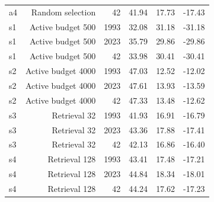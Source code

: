 \documentclass{article}
\begin{document}
\begin{table}[htbp]
\begin{tabular}{lrrrrr}
    a4 & Random selection & 42 & 41.94 & 17.73 & -17.43 \\
    s1 & Active budget 500 & 1993 & 32.08 & 31.18 & -31.18 \\
    s1 & Active budget 500 & 2023 & 35.79 & 29.86 & -29.86 \\
    s1 & Active budget 500 & 42 & 33.98 & 30.41 & -30.41 \\
    s2 & Active budget 4000 & 1993 & 47.03 & 12.52 & -12.02 \\
    s2 & Active budget 4000 & 2023 & 47.61 & 13.93 & -13.59 \\
    s2 & Active budget 4000 & 42 & 47.33 & 13.48 & -12.62 \\
    s3 & Retrieval 32 & 1993 & 41.93 & 16.91 & -16.79 \\
    s3 & Retrieval 32 & 2023 & 43.36 & 17.88 & -17.41 \\
    s3 & Retrieval 32 & 42 & 42.13 & 16.86 & -16.40 \\
    s4 & Retrieval 128 & 1993 & 43.41 & 17.48 & -17.21 \\
    s4 & Retrieval 128 & 2023 & 44.84 & 18.34 & -18.01 \\
    s4 & Retrieval 128 & 42 & 44.24 & 17.62 & -17.23 \\
    \bottomrule
  \end{tabular}
\end{table}
\end{document}
